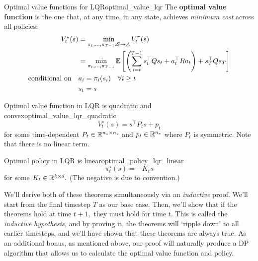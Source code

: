 \documentclass[../main/main]{subfiles}
\begin{document}
\begin{definition}[breakable=false]{Optimal value functions for LQR}{optimal_value_lqr}
    The \textbf{optimal value function} is the one that, at any time, in any state,
    achieves \emph{minimum cost} across all policies: \[
        \begin{split}
            V^\star_t(s) &= \min_{\pi_t, \dots, \pi_{T-1} : \mathcal{S} \to \mathcal{A}} V^\pi_t(s) \\
            &= \min_{\pi_{t}, \dots, \pi_{T-1}} \operatorname*{\mathbb{E}} \left[ \left( \sum_{i=t}^{T-1} s_t^\top Q s_t + a_t^\top R a_t \right) + s_T^\top Q s_T \right] \\
            \textrm{conditional on} \quad & a_i = \pi_i(s_i) \quad \forall i \ge t \\
            & s_t = s
        \end{split}
    \]
\end{definition}

\begin{theorem}{Optimal value function in LQR is quadratic and convex}{optimal_value_lqr_quadratic}
    \[
        V^\star_t(s) = s^\top P_t s + p_t
    \]
    for some time-dependent $P_t \in \mathbb{R}^{n_s \times n_s}$ and $p_t \in \mathbb{R}^{n_s}$ where $P_t$ is symmetric. Note that there is no linear term.
\end{theorem}

\begin{theorem}{Optimal policy in LQR is linear}{optimal_policy_lqr_linear}
    \[
        \pi^\star_t (s) = - K_t s
    \]
    for some $K_t \in \mathbb{R}^{k \times d}.$ (The negative is due to convention.)
\end{theorem}





We'll derive both of these theorems simultaneously via an \emph{inductive} proof.
We'll start from the final timestep $T$ as our base case.
Then, we'll show that if the theorems hold at time $t+1,$ they must hold for time $t.$
This is called the \emph{inductive hypothesis,} and by proving it, the theorems will `ripple down' to all earlier timesteps, and we'll have shown that these theorems are always true.
As an additional bonus, as mentioned above, our proof will naturally produce a DP algorithm that allows us to calculate the optimal value function and policy.
\end{document}
